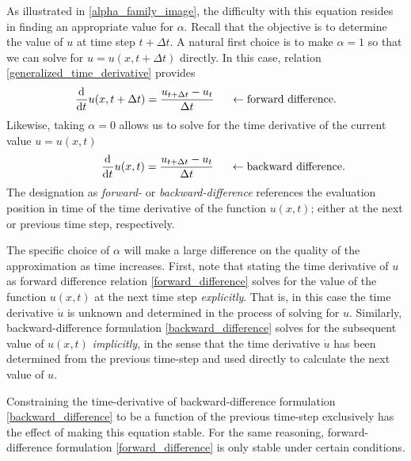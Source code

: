 As illustrated in \cref{alpha_family_image}, the difficulty with this equation resides in finding an appropriate value for $\alpha$.  Recall that the objective is to determine the value of $u$ at time step $t+\Delta t$.  A natural first choice is to make $\alpha = 1$ so that we can solve for $u = u(x,t+\Delta t)$ directly.  In this case, relation \cref{generalized_time_derivative} provides 
\begin{align}
  \label{forward_difference}
  \frac{\mathrm{d}{^{}} }{\mathrm{d} t{^{}} } u(x,t+\Delta t) = \frac{u_{t+\Delta t} - u_t}{\Delta t} \hspace{5mm} \leftarrow \text{forward difference}.
\end{align}
Likewise, taking $\alpha = 0$ allows us to solve for the time derivative of the current value $u = u(x,t)$ 
\begin{align}
  \label{backward_difference}
  \phantom{tt + \Delta t} \frac{\mathrm{d}{^{}} }{\mathrm{d} t{^{}} } u(x,t) = \frac{u_{t + \Delta t} - u_t}{\Delta t} \hspace{5mm} \leftarrow \text{backward difference}.
\end{align}
The designation as \emph{forward-} or \emph{backward-difference} references the evaluation position in time of the time derivative of the function $u(x,t)$; either at the next or previous time step, respectively.

The specific choice of $\alpha$ will make a large difference on the quality of the approximation as time increases.  First, note that stating the time derivative of $u$ as forward difference relation \cref{forward_difference} solves for the value of the function $u(x,t)$ at the next time step \emph{explicitly}.  That is, in this case the time derivative $\dot{u}$ is unknown and determined in the process of solving for $u$.  Similarly, backward-difference formulation \cref{backward_difference} solves for the subsequent value of $u(x, t)$ \emph{implicitly}, in the sense that the time derivative $\dot{u}$ has been determined from the previous time-step and used directly to calculate the next value of $u$.

Constraining the time-derivative of backward-difference formulation \cref{backward_difference} to be a function of the previous time-step exclusively has the effect of making this equation stable.  For the same reasoning, forward-difference formulation \cref{forward_difference} is only stable under certain conditions.

